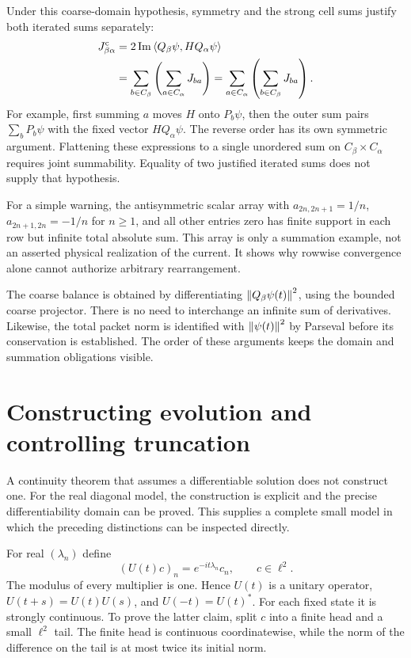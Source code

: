 Under this coarse-domain hypothesis, symmetry and the strong cell sums justify both iterated sums separately:
\begin{align*}
 J^{\rm c}_{\beta\alpha}
 &=2\operatorname{Im}\left\langle Q_\beta\psi,HQ_\alpha\psi\right\rangle\\
 &=\sum_{b\in C_\beta}\left(\sum_{a\in C_\alpha}J_{ba}\right)
 =\sum_{a\in C_\alpha}\left(\sum_{b\in C_\beta}J_{ba}\right).
\end{align*}
For example, first summing $a$ moves $H$ onto $P_b\psi$, then the outer sum pairs $\sum_bP_b\psi$ with the fixed vector $HQ_\alpha\psi$. The reverse order has its own symmetric argument. Flattening these expressions to a single unordered sum on $C_\beta\times C_\alpha$ requires joint summability. Equality of two justified iterated sums does not supply that hypothesis.

For a simple warning, the antisymmetric scalar array with $a_{2n,2n+1}=1/n$, $a_{2n+1,2n}=-1/n$ for $n\geq1$, and all other entries zero has finite support in each row but infinite total absolute sum. This array is only a summation example, not an asserted physical realization of the current. It shows why rowwise convergence alone cannot authorize arbitrary rearrangement.

The coarse balance is obtained by differentiating $\left\lVert Q_\beta\psi(t)\right\rVert^2$, using the bounded coarse projector. There is no need to interchange an infinite sum of derivatives. Likewise, the total packet norm is identified with $\left\lVert\psi(t)\right\rVert^2$ by Parseval before its conservation is established. The order of these arguments keeps the domain and summation obligations visible.



\section{Constructing evolution and controlling truncation}
\label{sec:foundation-spectral-evolution}

A continuity theorem that assumes a differentiable solution does not construct one. For the real diagonal model, the construction is explicit and the precise differentiability domain can be proved. This supplies a complete small model in which the preceding distinctions can be inspected directly.

For real $(\lambda_n)$ define
\begin{equation}
 (U(t)c)_n=e^{-it\lambda_n}c_n,\qquad c\in\ell^2.
 \label{eq:foundation-spectral-flow}
\end{equation}
The modulus of every multiplier is one. Hence $U(t)$ is a unitary operator, $U(t+s)=U(t)U(s)$, and $U(-t)=U(t)^*$. For each fixed state it is strongly continuous. To prove the latter claim, split $c$ into a finite head and a small $\ell^2$ tail. The finite head is continuous coordinatewise, while the norm of the difference on the tail is at most twice its initial norm.

